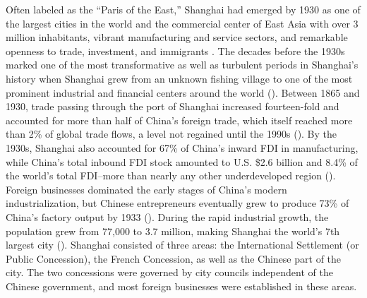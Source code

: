 \documentclass[12pt]{article}
\begin{document}
Often labeled as the ``Paris of the East,'' Shanghai had emerged by 1930 as one of the largest cities in the world and the commercial center of East Asia with over 3 million inhabitants, vibrant manufacturing and service sectors, and remarkable openness to trade, investment, and immigrants \citep{Osterhammel1989}. The decades before the 1930s marked one of the most transformative as well as turbulent periods in Shanghai's history when Shanghai grew from an unknown fishing village to one of the most prominent industrial and financial centers around the world (\citealp{Brandt2014}). Between 1865 and 1930, trade passing through the port of Shanghai increased fourteen-fold and accounted for more than half of China's foreign trade, which itself reached more than 2\% of global trade flows, a level not regained until the 1990s (\citealp{Lardy1994}). By the 1930s, Shanghai also accounted for 67\% of China's inward FDI in manufacturing, while China's total inbound FDI stock amounted to U.S. \$2.6 billion and 8.4\% of the world's total FDI--more than nearly any other underdeveloped region (\citealp{Hou1965}). Foreign businesses dominated the early stages of China's modern industrialization, but Chinese entrepreneurs eventually grew to produce 73\% of China's factory output by 1933 (\citealp{Rawski1989}). During the rapid industrial growth, the population grew from 77,000 to 3.7 million, making Shanghai the world's 7th largest city (\citealp{Ma2008}). Shanghai consisted of three areas: the International Settlement (or Public Concession), the French Concession, as well as the Chinese part of the city. The two concessions were governed by city councils independent of the Chinese government, and most foreign businesses were established in these areas.
\end{document}
